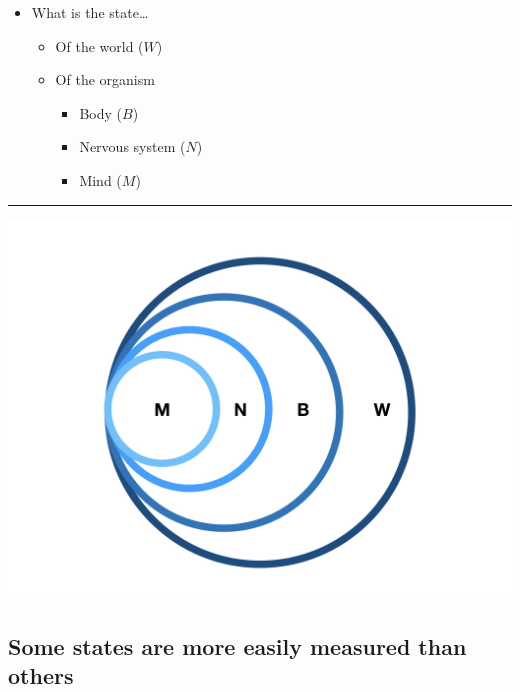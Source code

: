 \documentclass[]{article}
\providecommand{\tightlist}{%
  \setlength{\itemsep}{0pt}\setlength{\parskip}{0pt}}
\begin{document}
\begin{itemize}
\tightlist
\item
  What is the state\ldots{}

  \begin{itemize}
  \tightlist
  \item
    Of the world (\(W\))
  \item
    Of the organism

    \begin{itemize}
    \tightlist
    \item
      Body (\(B\))
    \item
      Nervous system (\(N\))
    \item
      Mind (\(M\))
    \end{itemize}
  \end{itemize}
\end{itemize}

\begin{center}\rule{0.5\linewidth}{\linethickness}\end{center}

\begin{center}\includegraphics[width=800px]{img/nested-causality-labels} \end{center}

\hypertarget{some-states-are-more-easily-measured-than-others}{%
\subsection{Some states are more easily measured than
others}\label{some-states-are-more-easily-measured-than-others}}
\end{document}
